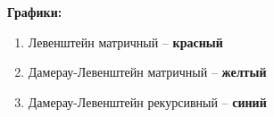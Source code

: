 \documentclass[a4paper,14pt]{report} %
\begin{document}
\textbf{Графики:}
\begin{enumerate}
  \item Левенштейн матричный -- \textbf{красный} \\
  \item Дамерау-Левенштейн матричный -- \textbf{желтый}\\
  \item Дамерау-Левенштейн рекурсивный -- \textbf{синий}
\end{enumerate}

  \begin{figure}[h]
  \end{figure} 
  
    \begin{figure}[h]
  \end{figure} 
  
\end{document}

